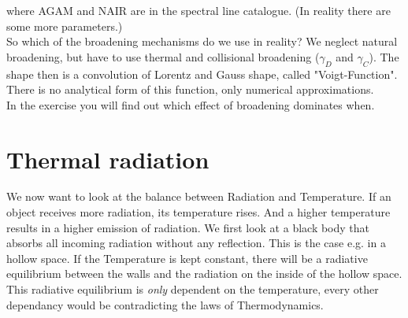 where AGAM and NAIR are in the spectral line catalogue. (In reality there are some more parameters.) \\

So which of the broadening mechanisms do we use in reality? We neglect natural broadening, but have to use thermal and collisional broadening ($\gamma_{D}$ and $\gamma_{C}$). The shape then is a convolution of Lorentz and Gauss shape, called "Voigt-Function". There is no analytical form of this function, only numerical approximations. \\

In the exercise you will find out which effect of broadening dominates when. 

\section{Thermal radiation}

We now want to look at the balance between Radiation and Temperature. If an object receives more radiation, its temperature rises. And a higher temperature results in a higher emission of radiation. We first look at a black body that absorbs all incoming radiation without any reflection. This is the case e.g. in a hollow space. If the Temperature is kept constant, there will be a radiative equilibrium between the walls and the radiation on the inside of the hollow space. This radiative equilibrium is \textit{only} dependent on the temperature, every other dependancy would be contradicting the laws of Thermodynamics.

